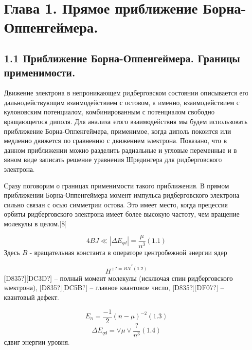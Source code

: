 \documentclass[a4paper]{article}
\title{}
\author{}
\date{2016-07-10}
\begin{document}
\clearpage\section{Глава 1. Прямое
приближение
Борна-Оппенгеймера.}
\hypertarget{RefHeading4669463868395}{}\subsection{1.1
Приближение Борна-Оппенгеймера. Границы
применимости.}
\hypertarget{RefHeading4671463868395}{}Движение
электрона в непроникающем ридберговском состоянии описывается его дальнодействующим взаимодействием с остовом, а именно, взаимодействием с кулоновским потенциалом, комбинированным с потенциалом свободно вращающегося диполя. Для анализа этого взаимодействия мы будем использовать приближение Борна-Оппенгеймера, применимое, когда диполь покоится или медленно движется по сравнению с движением электрона. Показано, что в данном приближении можно разделить радиальные и угловые переменные и в явном виде записать решение уравнения Шредингера для ридберговского электрона.

Сразу поговорим о границах применимости такого приближения. В прямом приближении Борна-Оппенгеймера момент импульса ридберговского электрона сильно связан с осью симметрии остова. Это имеет место, когда прецессия орбиты ридберговского электрона имеет более высокую частоту, чем вращение молекулы в целом.[8]

\begin{equation*}
4\mathit{BJ}{\ll}\left|{\Delta}E_{\mathit{qd}}\right|=\frac{\mu }{n^3}(1.1)
\end{equation*}
Здесь  $B$ -
вращательная константа в операторе центробежной энергии ядер

\begin{equation*}
H^{+?=B\widehat  N^2(1.2)}
\end{equation*}
\textlatin{[D835?]}\textlatin{[DC3D?]} -- полный
момент молекулы (исключая спин ридберговского
электрона), \textlatin{[D835?]}\textlatin{[DC5B?]} --
главное квантовое
число, \textlatin{[D835?]}\textlatin{[DF07?]} --
квантовый дефект.

\begin{equation*}
E_n=\frac{-1} 2\left(n-\mu \right)^{-2}(1.3)
\end{equation*}
\begin{equation*}
{\Delta}E_{\mathit{qd}}=\vee \mu \vee \frac ?{n^3}(1.4)
\end{equation*}
сдвиг энергии уровня.
\end{document}
